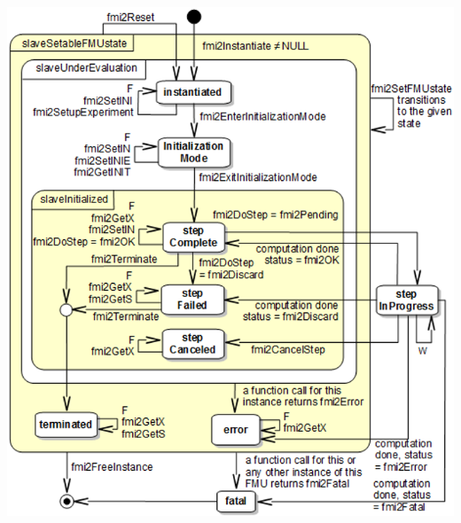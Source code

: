 \documentclass[compress,newPxFont,sthlmFooter]{beamer}
\begin{document}
\begin{frame}
\begin{columns}[c]
      \begin{column}{0.45\paperwidth}
        \begin{center}
          \includegraphics[align=c, width=0.4\paperwidth]{StateMachineCoSimulation.png}
        \end{center}
      \end{column}
    \end{columns}
\end{frame}
\end{document}
